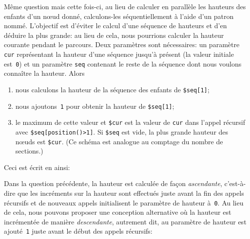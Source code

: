 Même question mais cette fois-ci, au lieu de calculer en parallèle les
hauteurs des enfants d'un nœud donné, calculons-les
séquentiellement à l'aide d'un patron nommé. L'objectif est d'éviter
le calcul d'une séquence de hauteurs et d'en déduire la plus grande:
au lieu de cela, nous pourrions calculer la hauteur courante pendant
le parcours. Deux paramètres sont nécessaires: un paramètre
\texttt{cur} représentant la hauteur d'une séquence jusqu'à présent
(la valeur initiale est~\texttt{0}) et un paramètre \texttt{seq}
contenant le reste de la séquence dont nous voulons connaître la
hauteur. Alors
\begin{enumerate}

  \item nous calculons la hauteur de la séquence des enfants de
    \texttt{\$seq[1]};

  \item nous ajoutons~\texttt{1} pour obtenir la hauteur de
    \texttt{\$seq[1]};

  \item le maximum de cette valeur et \texttt{\$cur} est la valeur de
    \texttt{cur} dans l'appel récursif avec
    \texttt{\$seq[position()>1]}. Si \texttt{\$seq} est vide, la plus
    grande hauteur des nœuds est \texttt{\$cur}. (Ce schéma est
    analogue au comptage du nombre de sections.)

\end{enumerate}
\noindent Ceci est écrit en \XSLT ainsi:

Dans la question précédente, la hauteur est calculée de façon
\emph{ascendante}, c'est-à-dire que les incréments sur la hauteur sont
effectués juste avant la fin des appels récursifs et de nouveaux
appels initialisent le paramètre de hauteur à~\texttt{0}. Au lieu de
cela, nous pouvons proposer une conception alternative où la hauteur
est incrémentée de manière \emph{descendante}, autrement dit, au
paramètre de hauteur est ajouté~\texttt{1} juste avant le début des
appels récursifs:


